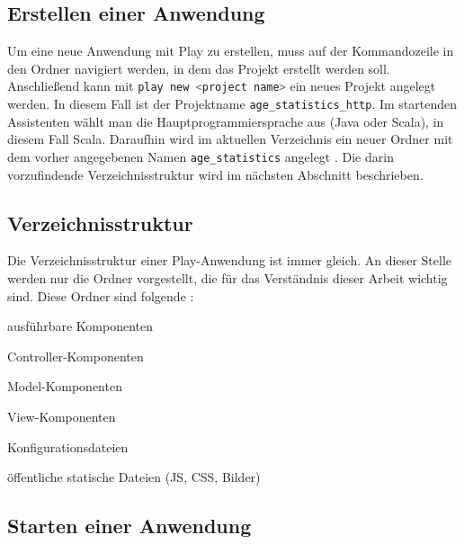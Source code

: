 

\subsection{Erstellen einer Anwendung} %
\label{sub:erstellen_einer_anwendung}

Um eine neue Anwendung mit Play zu erstellen, muss auf der Kommandozeile in den Ordner navigiert werden, in dem das Projekt erstellt werden soll.
Anschließend kann mit \lstinline[language=sh]|play new <project name>| ein neues Projekt angelegt werden.
In diesem Fall ist der Projektname \lstinline|age_statistics_http|.
Im startenden Assistenten wählt man die Hauptprogrammiersprache aus (Java oder Scala), in diesem Fall Scala.
Daraufhin wird im aktuellen Verzeichnis ein neuer Ordner mit dem vorher angegebenen Namen \lstinline|age_statistics| angelegt \cite[vgl.][S.~10]{play_for_scala}.
Die darin vorzufindende Verzeichnisstruktur wird im nächsten Abschnitt beschrieben.



\subsection{Verzeichnisstruktur} %
\label{sub:verzeichnisstruktur}

Die Verzeichnisstruktur einer Play-Anwendung ist immer gleich.
An dieser Stelle werden nur die Ordner vorgestellt, die für das Verständnis dieser Arbeit wichtig sind.
Diese Ordner sind folgende \cite[vgl.][]{play_verzeichnisstruktur}:

\begin{description}[leftmargin=!,labelwidth=\widthof{\bfseries app/controllers/}]
  \item[app/] ausführbare Komponenten
  \item[app/controllers/] Controller-Komponenten
  \item[app/models/] Model-Komponenten
  \item[app/views/] View-Komponenten
  \item[conf/] Konfigurationsdateien
  \item[public/] öffentliche statische Dateien (JS, CSS, Bilder)
\end{description}



\subsection{Starten einer Anwendung} %
\label{sub:starten_einer_anwendung}

